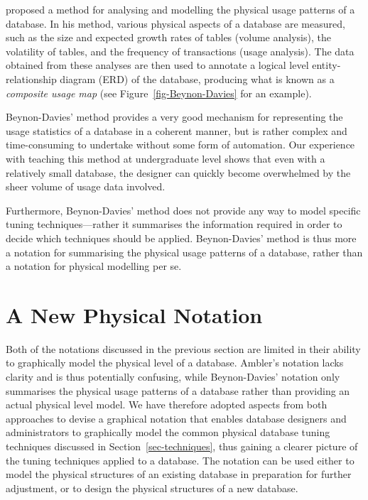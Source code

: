 \documentclass{CRPITStyle}
\begin{document}
 proposed a method for analysing and
modelling the physical usage patterns of a database. In his method,
various physical aspects of a database are measured, such as the size
and expected growth rates of tables (volume analysis), the volatility of
tables, and the frequency of transactions (usage analysis). The data
obtained from these analyses are then used to annotate a logical level
entity-relationship diagram (ERD) of the database, producing what is
known as a \emph{composite usage map} (see
Figure~\ref{fig-Beynon-Davies} for an example).

Beynon-Davies' method provides a very good mechanism for representing
the usage statistics of a database in a coherent manner, but is rather
complex and time-consuming to undertake without some form of automation.
Our experience with teaching this method at undergraduate level shows
that even with a relatively small database, the designer can quickly
become overwhelmed by the sheer volume of usage data involved.

Furthermore, Beynon-Davies' method does not provide any way to model
specific tuning techniques---rather it summarises the information
required in order to decide which techniques should be applied.
Beynon-Davies' method is thus more a notation for summarising the
physical usage patterns of a database, rather than a notation for
physical modelling per se.


\section{A New Physical Notation}
\label{sec-notation}

Both of the notations discussed in the previous section are limited in
their ability to graphically model the physical level of a database.
Ambler's notation lacks clarity and is thus potentially confusing, while
Beynon-Davies' notation only summarises the physical usage patterns of a
database rather than providing an actual physical level model. We have
therefore adopted aspects from both approaches to devise a graphical
notation that enables database designers and administrators to
graphically model the common physical database tuning techniques
discussed in Section~\ref{sec-techniques}, thus gaining a clearer
picture of the tuning techniques applied to a database. The notation can
be used either to model the physical structures of an existing database
in preparation for further adjustment, or to design the physical
structures of a new database.
\end{document}
